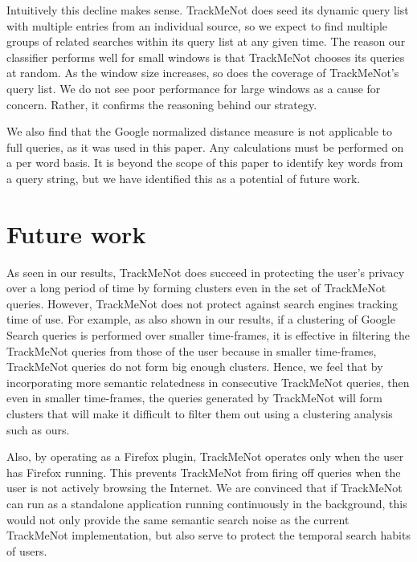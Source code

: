 \documentclass[11pt]{article}
\begin{document}
\begin{multicols}{2}
Intuitively this decline makes sense.  TrackMeNot does seed its
dynamic query list with multiple entries from an individual source, so
we expect to find multiple groups of related searches within its query
list at any given time. The reason our classifier performs well for
small windows is that TrackMeNot chooses its queries at random. As the
window size increases, so does the coverage of TrackMeNot's query
list. We do not see poor performance for large windows as a cause for
concern. Rather, it confirms the reasoning behind our strategy.

We also find that the Google normalized distance measure is not
applicable to full queries, as it was used in this paper. Any
calculations must be performed on a per word basis. It is beyond the
scope of this paper to identify key words from a query string, but we
have identified this as a potential of future work.


\section{Future work}
\label{sec:future}
As seen in our results, TrackMeNot does succeed in protecting the
user's privacy over a long period of time by forming clusters even in
the set of TrackMeNot queries. However, TrackMeNot does not protect
against search engines tracking time of use. For example, as also
shown in our results, if a clustering of Google Search queries is
performed over smaller time-frames, it is effective in filtering
the TrackMeNot queries from those of the user because in smaller
time-frames, TrackMeNot queries do not form big enough
clusters. Hence, we feel that by incorporating more semantic
relatedness in consecutive TrackMeNot queries, then even in smaller time-frames, the
queries generated by TrackMeNot will form clusters that will make it
difficult to filter them out using a clustering analysis such as ours.

Also, by operating as a Firefox plugin, TrackMeNot operates only when
the user has Firefox running. This prevents TrackMeNot from firing off
queries when the user is not actively browsing the Internet. We are
convinced that if TrackMeNot can run as a standalone application
running continuously in the background, this would not only provide
the same semantic search noise as the current TrackMeNot
implementation, but also serve to protect the temporal search habits
of users.



\end{multicols}
\newpage
\end{document}
